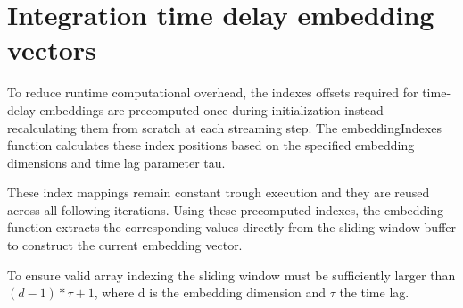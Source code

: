\section{Integration time delay embedding vectors}
To reduce runtime computational overhead, the indexes offsets required for time-delay embeddings are precomputed once during initialization instead recalculating them from scratch at each streaming step. The embeddingIndexes function calculates these index positions based on the specified embedding dimensions and time lag parameter tau. 

These index mappings remain constant trough execution and they are reused across all following iterations. Using these precomputed indexes, the embedding function extracts the corresponding values directly from the sliding window buffer to construct the current embedding vector.

To ensure valid array indexing the sliding window must be sufficiently larger than $(d - 1) * \tau + 1$, where d is the embedding dimension and $\tau$ the time lag.